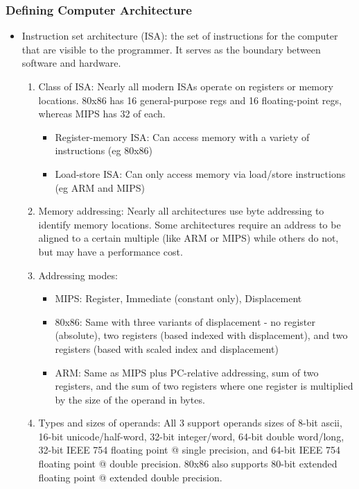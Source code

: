\subsubsection{Defining Computer Architecture}
\begin{itemize}
    \item Instruction set architecture (ISA): the set of instructions for the computer that are visible to the programmer. It serves as the boundary between software and hardware.
    \begin{enumerate}
        \item Class of ISA: Nearly all modern ISAs operate on registers or memory locations. 80x86 has 16 general-purpose regs and 16 floating-point regs, whereas MIPS has 32 of each.
        \begin{itemize}
            \item Register-memory ISA: Can access memory with a variety of instructions (eg 80x86)
            \item Load-store ISA: Can only access memory via load/store instructions (eg ARM and MIPS)
        \end{itemize}
        \item Memory addressing: Nearly all architectures use byte addressing to identify memory locations. Some architectures require an address to be aligned to a certain multiple (like ARM or MIPS) while others do not, but may have a performance cost.
        \item Addressing modes: 
        \begin{itemize}
            \item MIPS: Register, Immediate (constant only), Displacement
            \item 80x86: Same with three variants of displacement - no register (absolute), two registers (based indexed with displacement), and two registers (based with scaled index and displacement) 
            \item ARM: Same as MIPS plus PC-relative addressing, sum of two registers, and the sum of two registers where one register is multiplied by the size of the operand in bytes.
        \end{itemize}
        \item Types and sizes of operands: All 3 support operands sizes of 8-bit ascii, 16-bit unicode/half-word, 32-bit integer/word, 64-bit double word/long, 32-bit IEEE 754 floating point @ single precision, and 64-bit IEEE 754 floating point @ double precision. 80x86 also supports 80-bit extended floating point @ extended double precision.

\end{enumerate}
\end{itemize}
